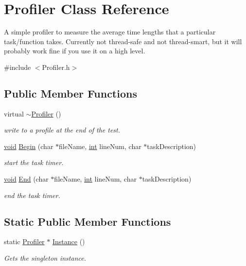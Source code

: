\hypertarget{class_profiler}{}\section{Profiler Class Reference}
\label{class_profiler}


A simple profiler to measure the average time lengths that a particular task/function takes. Currently not thread-\/safe and not thread-\/smart, but it will probably work fine if you use it on a high level.  




{\ttfamily \#include $<$Profiler.\+h$>$}

\subsection*{Public Member Functions}
\begin{DoxyCompactItemize}
\item 
virtual \hyperlink{class_profiler_a1e6dd8f6cfb15cd5237b971d8f49c749}{$\sim$\+Profiler} ()
\begin{DoxyCompactList}\small\item\em write to a profile at the end of the test. \end{DoxyCompactList}\item 
\hyperlink{sound_8c_ae35f5844602719cf66324f4de2a658b3}{void} \hyperlink{class_profiler_a9bc2babecd159def3f13f8d3948fdf85}{Begin} (char $\ast$file\+Name, \hyperlink{xmltok_8h_a5a0d4a5641ce434f1d23533f2b2e6653}{int} line\+Num, char $\ast$task\+Description)
\begin{DoxyCompactList}\small\item\em start the task timer. \end{DoxyCompactList}\item 
\hyperlink{sound_8c_ae35f5844602719cf66324f4de2a658b3}{void} \hyperlink{class_profiler_aab3b9d9786a7ee336c3b5616e973c8c3}{End} (char $\ast$file\+Name, \hyperlink{xmltok_8h_a5a0d4a5641ce434f1d23533f2b2e6653}{int} line\+Num, char $\ast$task\+Description)
\begin{DoxyCompactList}\small\item\em end the task timer. \end{DoxyCompactList}\end{DoxyCompactItemize}
\subsection*{Static Public Member Functions}
\begin{DoxyCompactItemize}
\item 
static \hyperlink{class_profiler}{Profiler} $\ast$ \hyperlink{class_profiler_ad7dfa835639055a006abb848f10d348f}{Instance} ()
\begin{DoxyCompactList}\small\item\em Gets the singleton instance. \end{DoxyCompactList}\end{DoxyCompactItemize}

